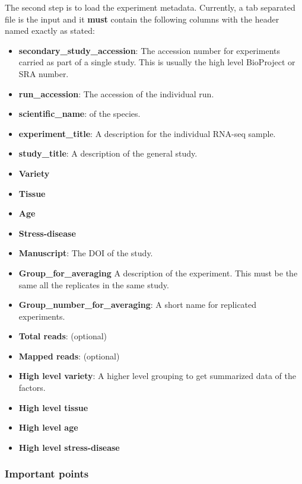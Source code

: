 The second step is to load the experiment metadata. Currently, a tab
separated file is the input and it \textbf{must} contain the following
columns with the header named exactly as stated:

\begin{itemize}
\itemsep1pt\parskip0pt
\item
  \textbf{secondary\_study\_accession}: The accession number for
  experiments carried as part of a single study. This is usually the
  high level BioProject or SRA number.
\item
  \textbf{run\_accession}: The accession of the individual run.
\item
  \textbf{scientific\_name}: of the species.
\item
  \textbf{experiment\_title}: A description for the individual RNA-seq
  sample.
\item
  \textbf{study\_title}: A description of the general study.
\item
  \textbf{Variety}
\item
  \textbf{Tissue}
\item
  \textbf{Age}
\item
  \textbf{Stress-disease}
\item
  \textbf{Manuscript}: The DOI of the study.
\item
  \textbf{Group\_for\_averaging} A description of the experiment. This
  must be the same all the replicates in the same study.
\item
  \textbf{Group\_number\_for\_averaging}: A short name for replicated
  experiments.\\
\item
  \textbf{Total reads}: (optional)
\item
  \textbf{Mapped reads}: (optional)
\item
  \textbf{High level variety}: A higher level grouping to get summarized
  data of the factors.
\item
  \textbf{High level tissue}
\item
  \textbf{High level age}
\item
  \textbf{High level stress-disease}
\end{itemize}

\subsubsection{Important points}\label{important-points}

